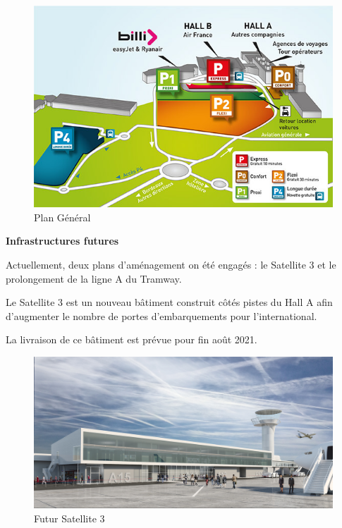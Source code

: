 \begin{figure}[hbt!]
    \centering
    \includegraphics[width=12cm]{Images/plan.jpg}
    \caption{Plan Général}
    \label{fig:plangeneral}
\end{figure}

\newpage

\textbf{Infrastructures futures}\newline

Actuellement, deux plans d'aménagement on été engagés : le Satellite 3 et le prolongement de la ligne A du Tramway.

Le Satellite 3 est un nouveau bâtiment construit côtés pistes du Hall A afin d'augmenter le nombre de portes d'embarquements pour l'international.

La livraison de ce bâtiment est prévue pour fin août 2021.\newline

\begin{figure}[hbt!]
    \centering
    \includegraphics[width=13cm]{Images/satellite3.jpg}
    \caption{Futur Satellite 3}
    \label{fig:sat3}
\end{figure}

